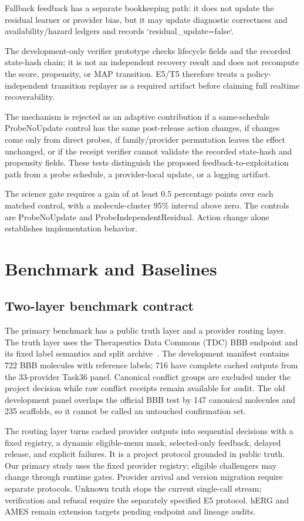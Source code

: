 \documentclass[sigconf,anonymous]{aamas}
\begin{document}
Fallback feedback has a separate bookkeeping path: it does not update the residual learner or provider bias, but it may update diagnostic correctness and availability/hazard ledgers and records `residual\_update=false`.

The development-only verifier prototype checks lifecycle fields and the recorded state-hash chain; it is not an independent recovery result and does not recompute the score, propensity, or MAP transition. E5/T5 therefore treats a policy-independent transition replayer as a required artifact before claiming full realtime recoverability.

The mechanism is rejected as an adaptive contribution if a same-schedule ProbeNoUpdate control has the same post-release action changes, if changes come only from direct probes, if family/provider permutation leaves the effect unchanged, or if the receipt verifier cannot validate the recorded state-hash and propensity fields. These tests distinguish the proposed feedback-to-exploitation path from a probe schedule, a provider-local update, or a logging artifact.

The science gate requires a gain of at least $0.5$ percentage points over each matched control, with a molecule-cluster 95\% interval above zero. The controls are ProbeNoUpdate and ProbeIndependentResidual. Action change alone establishes implementation behavior.

\section{Benchmark and Baselines}
\subsection{Two-layer benchmark contract}
The primary benchmark has a public truth layer and a provider routing layer. The truth layer uses the Therapeutics Data Commons (TDC) BBB endpoint and its fixed label semantics and split archive~\cite{huang2021tdc}. The development manifest contains 722 BBB molecules with reference labels; 716 have complete cached outputs from the 33-provider Task36 panel. Canonical conflict groups are excluded under the project decision while raw conflict receipts remain available for audit. The old development panel overlaps the official BBB test by 147 canonical molecules and 235 scaffolds, so it cannot be called an untouched confirmation set.

The routing layer turns cached provider outputs into sequential decisions with a fixed registry, a dynamic eligible-menu mask, selected-only feedback, delayed release, and explicit failures. It is a project protocol grounded in public truth. Our primary study uses the fixed provider registry; eligible challengers may change through runtime gates. Provider arrival and version migration require separate protocols. Unknown truth stops the current single-call stream; verification and refusal require the separately specified E5 protocol. hERG and AMES remain extension targets pending endpoint and lineage audits.
\end{document}
